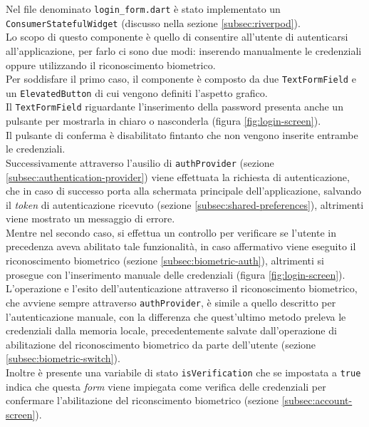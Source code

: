 Nel file denominato \lstinline{login_form.dart} è stato implementato un \lstinline{ConsumerStatefulWidget} (discusso nella sezione \ref{subsec:riverpod}).\\
Lo scopo di questo componente è quello di consentire all'utente di autenticarsi all'applicazione, per farlo ci sono due modi: inserendo manualmente le credenziali oppure utilizzando il riconoscimento biometrico.\\
Per soddisfare il primo caso, il componente è composto da due \lstinline{TextFormField}\cite{site:text-form-field} e un \lstinline{ElevatedButton}\cite{site:elevated-button} di cui vengono definiti l'aspetto grafico.\\
Il \lstinline{TextFormField} riguardante l'inserimento della password presenta anche un pulsante per mostrarla in chiaro o nasconderla (figura \ref{fig:login-screen}).\\
Il pulsante di conferma è disabilitato fintanto che non vengono inserite entrambe le credenziali.\\
Successivamente attraverso l'ausilio di \lstinline{authProvider} (sezione \ref{subsec:authentication-provider}) viene effettuata la richiesta di autenticazione, che in caso di successo porta alla schermata principale dell'applicazione, salvando il \emph{token} di autenticazione ricevuto (sezione \ref{subsec:shared-preferences}), altrimenti viene mostrato un messaggio di errore.\\ 
Mentre nel secondo caso, si effettua un controllo per verificare se l'utente in precedenza aveva abilitato tale funzionalità, in caso affermativo viene eseguito il riconoscimento biometrico (sezione \ref{subsec:biometric-auth}), altrimenti si prosegue con l'inserimento manuale delle credenziali (figura \ref{fig:login-screen}).\\
L'operazione e l'esito dell'autenticazione attraverso il riconoscimento biometrico, che avviene sempre attraverso \lstinline{authProvider}, è simile a quello descritto per l'autenticazione manuale, con la differenza che quest'ultimo metodo preleva le credenziali dalla memoria locale, precedentemente salvate dall'operazione di abilitazione del riconoscimento biometrico da parte dell'utente (sezione \ref{subsec:biometric-switch}). \\
Inoltre è presente una variabile di stato \lstinline{isVerification} che se impostata a \lstinline{true} indica che questa \emph{form} viene impiegata come verifica delle credenziali per confermare l'abilitazione del riconscimento biometrico (sezione \ref{subsec:account-screen}).

